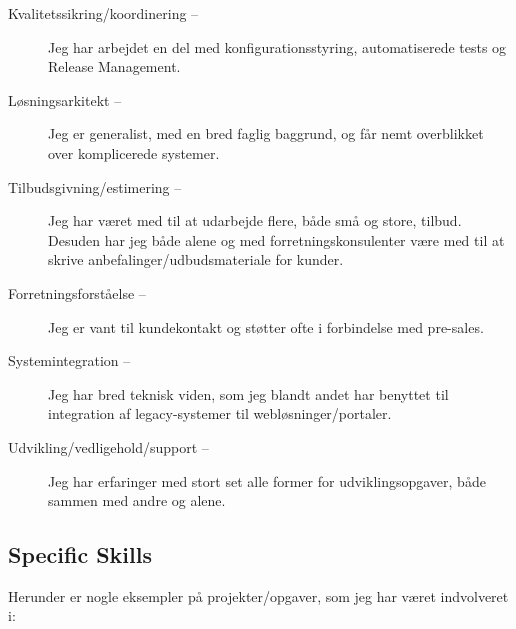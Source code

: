 \documentclass[a4paper,11pt]{article}
\begin{document}
\begin{description}

  \item[Kvalitetssikring/koordinering --] Jeg har arbejdet en del
    med konfigurationsstyring, automatiserede tests og Release
    Management.

  \item[Løsningsarkitekt --] Jeg er generalist, med en bred faglig
    baggrund, og får nemt overblikket over komplicerede systemer.

  \item[Tilbudsgivning/estimering --] Jeg har været med til at
    udarbejde flere, både små og store, tilbud. Desuden har jeg både
    alene og med forretningskonsulenter være med til at skrive
    anbefalinger/udbudsmateriale for kunder.

  \item[Forretningsforståelse --] Jeg er vant til kundekontakt og
    støtter ofte i forbindelse med pre-sales.

  \item[Systemintegration --] Jeg har bred teknisk viden, som jeg
    blandt andet har benyttet til integration af legacy-systemer til
    webløsninger/portaler.

  \item[Udvikling/vedligehold/support --] Jeg har erfaringer med
    stort set alle former for udviklingsopgaver, både sammen med
    andre og alene.

\end{description}

\subsection*{Specific Skills}

Herunder er nogle eksempler på projekter/opgaver, som jeg har været
indvolveret i:
\end{document}
